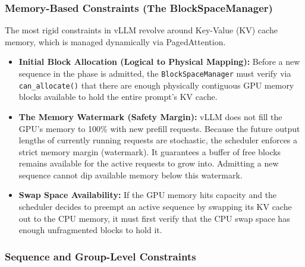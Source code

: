 \documentclass[11pt]{article}
\begin{document}
\subsubsection{Memory-Based Constraints (The BlockSpaceManager)}
The most rigid constraints in vLLM revolve around Key-Value (KV) cache memory, which is managed dynamically via PagedAttention.
\begin{itemize}
    \item \textbf{Initial Block Allocation (Logical to Physical Mapping):} Before a new sequence in the  phase is admitted, the \texttt{BlockSpaceManager} must verify via \texttt{can\_allocate()} that there are enough physically contiguous GPU memory blocks available to hold the entire prompt's KV cache. 
    \item \textbf{The Memory Watermark (Safety Margin):} vLLM does not fill the GPU's memory to 100\% with new prefill requests. Because the future output lengths of currently running requests are stochastic, the scheduler enforces a strict memory margin (watermark). It guarantees a buffer of free blocks remains available for the active  requests to grow into. Admitting a new sequence cannot dip available memory below this watermark.
    \item \textbf{Swap Space Availability:} If the GPU memory hits capacity and the scheduler decides to preempt an active sequence by swapping its KV cache out to the CPU memory, it must first verify that the CPU swap space has enough unfragmented blocks to hold it.
\end{itemize}

\subsubsection{Sequence and Group-Level Constraints}
\label{subsec:sequence_group_constraints}
\end{document}
